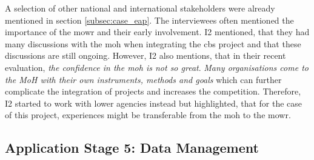 A selection of other national and international stakeholders were already mentioned in section \ref{subsec:case_eap}. The interviewees often mentioned the importance of the \acrshort{mowr} and their early involvement. I2 mentioned, that they had many discussions with the \acrshort{moh} when integrating the \acrshort{cbs} project and that these discussions are still ongoing. However, I2 also mentions, that in their recent evaluation, \textit{the confidence in the \acrshort{moh} is not so great}. \textit{Many organisations come to the MoH with their own instruments, methods and goals} which can further complicate the integration of projects and increases the competition. Therefore, I2 started to work with lower agencies instead but highlighted, that for the case of this project, experiences might be transferable from the \acrshort{moh} to the \acrshort{mowr}. 

\subsection{Application Stage 5: Data Management}\label{subsec:stage5_appl}

